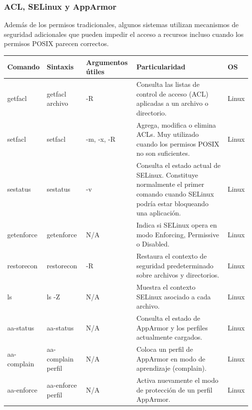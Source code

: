 \documentclass[a4paper,10pt]{article}
\begin{document}

\subsubsection{ACL, SELinux y AppArmor}

Además de los permisos tradicionales, algunos sistemas utilizan mecanismos de
seguridad adicionales que pueden impedir el acceso a recursos incluso cuando
los permisos POSIX parecen correctos.

\begin{longtable}{|p{2.8cm}|p{3.2cm}|p{4cm}|p{5.4cm}|p{1.5cm}|}

\hline
Comando &
Sintaxis &
Argumentos útiles &
Particularidad &
OS
\\
\hline
\endhead

getfacl &
getfacl archivo &
-R &
Consulta las listas de control de acceso (ACL) aplicadas a un archivo o directorio. &
Linux
\\
\hline

setfacl &
setfacl &
-m, -x, -R &
Agrega, modifica o elimina ACLs. Muy utilizado cuando los permisos POSIX no son suficientes. &
Linux
\\
\hline

sestatus &
sestatus &
-v &
Consulta el estado actual de SELinux. Constituye normalmente el primer comando cuando SELinux podría estar bloqueando una aplicación. &
Linux
\\
\hline

getenforce &
getenforce &
N/A &
Indica si SELinux opera en modo Enforcing, Permissive o Disabled. &
Linux
\\
\hline

restorecon &
restorecon &
-R &
Restaura el contexto de seguridad predeterminado sobre archivos y directorios. &
Linux
\\
\hline

ls &
ls -Z &
N/A &
Muestra el contexto SELinux asociado a cada archivo. &
Linux
\\
\hline

aa-status &
aa-status &
N/A &
Consulta el estado de AppArmor y los perfiles actualmente cargados. &
Linux
\\
\hline

aa-complain &
aa-complain perfil &
N/A &
Coloca un perfil de AppArmor en modo de aprendizaje (complain). &
Linux
\\
\hline

aa-enforce &
aa-enforce perfil &
N/A &
Activa nuevamente el modo de protección de un perfil AppArmor. &
Linux
\\
\hline

\end{longtable}
\end{document}
